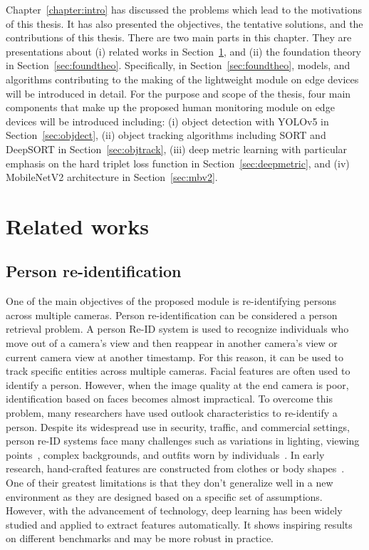 \documentclass[../main.tex]{subfiles}
\begin{document}
Chapter~\ref{chapter:intro} has discussed the problems which lead to the motivations of this thesis. It has also presented the objectives, the tentative solutions, and the contributions of this thesis. There are two main parts in this chapter. They are presentations about (i) related works in Section~\ref{sec:related}, and (ii) the foundation theory in Section~\ref{sec:foundtheo}. Specifically, in Section~\ref{sec:foundtheo}, models, and algorithms contributing to the making of the lightweight module on edge devices will be introduced in detail. For the purpose and scope of the thesis, four main components that make up the proposed human monitoring module on edge devices will be introduced including: (i) object detection with YOLOv5 in Section~\ref{sec:objdect}, (ii) object tracking algorithms including SORT and DeepSORT in Section~\ref{sec:objtrack}, (iii) deep metric learning with particular emphasis on the hard triplet loss function in Section~\ref{sec:deepmetric}, and (iv) MobileNetV2 architecture in Section~\ref{sec:mbv2}.

\section{Related works}
\label{sec:related}
\subsection{Person re-identification}
One of the main objectives of the proposed module is re-identifying persons across multiple cameras. Person re-identification can be considered a person retrieval problem. A person Re-ID system is used to recognize individuals who move out of a camera's view and then reappear in another camera's view or current camera view at another timestamp. For this reason, it can be used to track specific entities across multiple cameras. Facial features are often used to identify a person. However, when the image quality at the end camera is poor, identification based on faces becomes almost impractical. To overcome this problem, many researchers have used outlook characteristics to re-identify a person. Despite its widespread use in security, traffic, and commercial settings, person re-ID systems face many challenges such as variations in lighting, viewing points~\cite{karanam2015person}, complex backgrounds, and outfits worn by individuals~\cite{ye2021deep}. In early research, hand-crafted features are constructed from clothes or body shapes~\cite{matsukawa2016hierarchical, farenzena2010person}. One of their greatest limitations is that they don't generalize well in a new environment as they are designed based on a specific set of assumptions. However, with the advancement of technology, deep learning has been widely studied and applied to extract features automatically. It shows inspiring results on different benchmarks and may be more robust in practice. 
\end{document}
